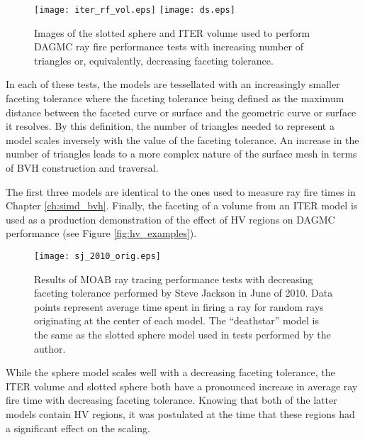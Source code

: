 \begin{figure}[H]
  \centering
    \texttt{[image: iter\_rf\_vol.eps]}
    \texttt{[image: ds.eps]}
  \caption[CAD models used in ray fire timing.]{Images of the slotted sphere and
    ITER volume used to perform DAGMC ray fire performance tests with increasing
    number of triangles or, equivalently, decreasing faceting tolerance.}
  \label{fig:sj_hv_test_models}
\end{figure} 

In each of these tests, the models are tessellated with an increasingly smaller
faceting tolerance where the faceting tolerance being defined as the maximum
distance between the faceted curve or surface and the geometric curve or surface
it resolves. By this definition, the number of triangles needed to represent a
model scales inversely with the value of the faceting tolerance. An increase in
the number of triangles leads to a more complex nature of the surface mesh in
terms of BVH construction and traversal.

The first three models are identical to the ones used to measure ray fire times
in Chapter \ref{ch:simd_bvh}. Finally, the faceting of a volume from an ITER
model is used as a production demonstration of the effect of HV
regions on DAGMC performance (see Figure \ref{fig:hv_examples}).

\begin{figure}[H]
  \centering
  \begin{center}
    \texttt{[image: sj\_2010\_orig.eps]} \\
    \caption[Previous results of ray fire timings from 2010.]{Results of MOAB
      ray tracing performance tests with decreasing faceting tolerance performed
      by Steve Jackson in June of 2010. Data points represent average time spent
      in firing a ray for random rays originating at the center of each
      model\cite{Tautges_2009}. The ``deathstar'' model is the same as the
      slotted sphere model used in tests performed by the author.}
    \label{fig:sj_hv_test_results}
  \end{center}
\end{figure}

While the sphere model scales well with a decreasing faceting tolerance, the
ITER volume and slotted sphere both have a pronounced increase in average ray
fire time with decreasing faceting tolerance. Knowing that both of the latter
models contain HV regions, it was postulated at the time that these
regions had a significant effect on the scaling.

